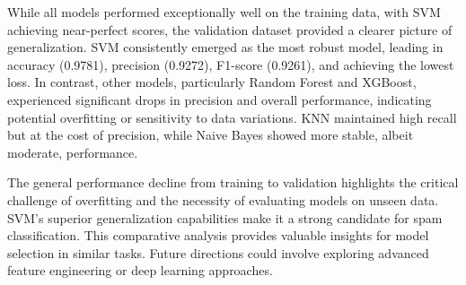 \documentclass[conference]{IEEEtran}
\begin{document}
    While all models performed exceptionally well on the training data, with SVM achieving near-perfect scores, the validation dataset provided a clearer picture of generalization.
    SVM consistently emerged as the most robust model, leading in accuracy (0.9781), precision (0.9272), F1-score (0.9261), and achieving the lowest loss.
    In contrast, other models, particularly Random Forest and XGBoost, experienced significant drops in precision and overall performance, indicating potential overfitting or sensitivity to data variations.
    KNN maintained high recall but at the cost of precision, while Naive Bayes showed more stable, albeit moderate, performance.

    The general performance decline from training to validation highlights the critical challenge of overfitting and the necessity of evaluating models on unseen data.
    SVM's superior generalization capabilities make it a strong candidate for spam classification.
    This comparative analysis provides valuable insights for model selection in similar tasks.
    Future directions could involve exploring advanced feature engineering or deep learning approaches.
\end{document}
